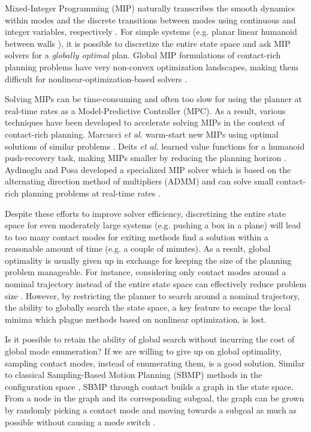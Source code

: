 Mixed-Integer Programming (MIP) \cite{bertsimas1997introduction} naturally transcribes the smooth dynamics within modes and the discrete transitions between modes using continuous and integer variables, respectively \cite{marcucci2019mixed}. For simple systems (e.g. planar linear humanoid between walls \cite{marcucci2017approximate}), it is possible to discretize the entire state space and ask MIP solvers for a \emph{globally optimal} plan. Global MIP formulations of contact-rich planning problems have very non-convex optimization landscapes, making them difficult for nonlinear-optimization-based solvers \cite{marcucci2019mixed}. 

Solving MIPs can be time-consuming and often too slow for using the planner at real-time rates as a Model-Predictive Controller (MPC). As a result, various techniques have been developed to accelerate solving MIPs in the context of contact-rich planning. Marcucci \textit{et al.} warm-start new MIPs using optimal solutions of similar problems \cite{marcucci2020warm}. Deits \textit{et al.} learned value functions for a humanoid push-recovery task, making MIPs smaller by reducing the planning horizon \cite{deits2019lvis}. Aydinoglu and Posa developed a specialized MIP solver which is based on the alternating direction method of multipliers (ADMM) and can solve small contact-rich planning problems at real-time rates \cite{aydinoglu2022real}. 

Despite these efforts to improve solver efficiency, discretizing the entire state space for even moderately large systems (e.g. pushing a box in a plane) will lead to too many contact modes for exiting methods find a solution within a reasonable amount of time (e.g. a couple of minutes). As a result, global optimality is usually given up in exchange for keeping the size of the planning problem manageable. For instance, considering only contact modes around a nominal trajectory instead of the entire state space can effectively reduce problem size \cite{hogan2020feedback, aceituno2020global}. However, by restricting the planner to search around a nominal trajectory, the ability to globally search the state space, a key feature to escape the local minima which plague methods based on nonlinear optimization, is lost. 

Is it possible to retain the ability of global search without incurring the cost of global mode enumeration? If we are willing to give up on global optimality, sampling contact modes, instead of enumerating them, is a good solution. Similar to classical Sampling-Based Motion Planning (SBMP) methods in the configuration space \cite{lavalle2006planning}, SBMP through contact builds a graph in the state space. From a node in the graph and its corresponding subgoal, the graph can be grown by randomly picking a contact mode and moving towards a subgoal as much as possible without causing a mode switch \cite{cheng2021contact, wu2020r3t}. 

